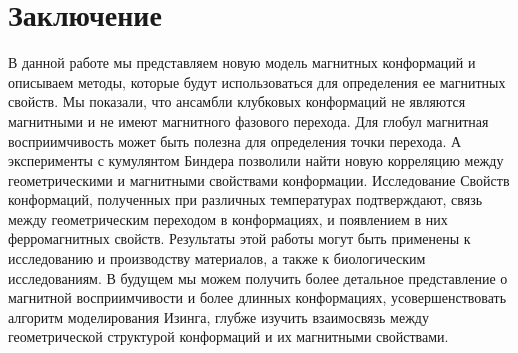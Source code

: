 \section{Заключение}

В данной работе мы представляем новую модель магнитных конформаций и описываем методы, которые будут использоваться для определения ее магнитных свойств. Мы показали, что ансамбли клубковых конформаций не являются магнитными и не имеют магнитного фазового перехода. Для глобул магнитная восприимчивость может быть полезна для определения точки перехода. А эксперименты с кумулянтом Биндера позволили найти новую корреляцию между геометрическими и магнитными свойствами конформации.
Исследование Свойств конформаций, полученных при различных температурах подтверждают, связь между геометрическим переходом в конформациях, и появлением в них ферромагнитных свойств.
Результаты этой работы могут быть применены к исследованию и производству материалов, а также к биологическим исследованиям. В будущем мы можем получить более детальное представление о магнитной восприимчивости и более длинных конформациях, усовершенствовать алгоритм моделирования Изинга, глубже изучить взаимосвязь между геометрической структурой конформаций и их магнитными свойствами. 